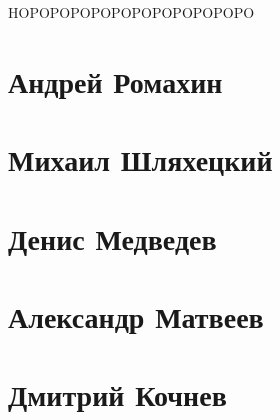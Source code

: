 \documentclass{article}
\begin{document}
HOPOPOPOPOPOPOPOPOPOPOPO

\section*{Андрей Ромахин}

\section*{Михаил Шляхецкий}

\section*{Денис Медведев}

\section*{Александр Матвеев}

\section*{Дмитрий Кочнев}
\end{document}
